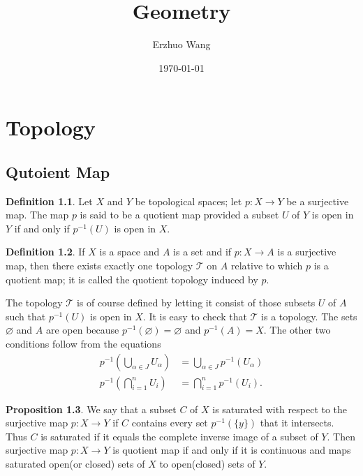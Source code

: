 \documentclass[12pt,a4paper]{book}
\theoremstyle{definition}
\newtheorem{defn}{Definition}[section]
\newtheorem{prop}[defn]{Proposition}
\begin{document}
\title{Geometry}
\author{Erzhuo Wang}
\date{\today}
\maketitle %
\tableofcontents



\newpage
\chapter{Topology}
\section{Qutoient Map}
\begin{defn}
    Let $X$ and $Y$ be topological spaces; let $p: X \rightarrow Y$ be a surjective map. The map $p$ is said to be a quotient map provided a subset $U$ of $Y$ is open in $Y$ if and only if $p^{-1}(U)$ is open in $X$.
\end{defn}
\begin{defn}
    If $X$ is a space and $A$ is a set and if $p: X \rightarrow A$ is a surjective map, then there exists exactly one topology $\mathcal{T}$ on $A$ relative to which $p$ is a quotient map; it is called the quotient topology induced by $p$.

    The topology $\mathcal{T}$ is of course defined by letting it consist of those subsets $U$ of $A$ such that $p^{-1}(U)$ is open in $X$. It is easy to check that $\mathcal{T}$ is a topology. The sets $\varnothing$ and $A$ are open because $p^{-1}(\varnothing)=\varnothing$ and $p^{-1}(A)=X$. The other two conditions follow from the equations
    $$
        \begin{aligned}
            p^{-1}\left(\bigcup_{\alpha \in J} U_\alpha\right) & =\bigcup_{\alpha \in J} p^{-1}\left(U_\alpha\right) \\
            p^{-1}\left(\bigcap_{i=1}^n U_i\right)             & =\bigcap_{i=1}^n p^{-1}\left(U_i\right) .
        \end{aligned}
    $$
\end{defn}
\begin{prop}
    We say that a subset $C$ of $X$ is saturated with respect to the surjective map $p: X \rightarrow Y$  if $C$ contains every set $p^{-1}(\{y\})$ that it intersects. Thus $C$ is saturated if it equals the complete inverse image of a subset of $Y$.
    Then surjective map $p: X \rightarrow Y$ is quotient map if and only if it is continuous and maps saturated open(or closed) sets of $X$ to open(closed) sets of $Y$.
\end{prop}
\end{document}
